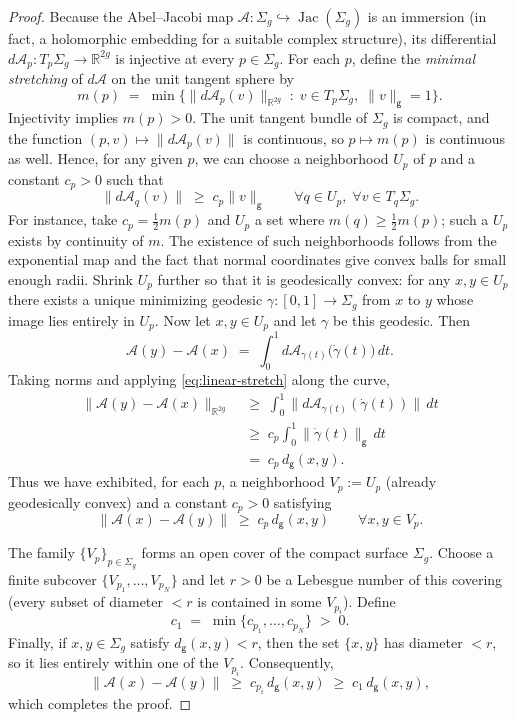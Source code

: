 \documentclass[11pt]{article}
\theoremstyle{definition}
\begin{document}
	\begin{proof}
		Because the Abel--Jacobi map $\mathcal A:\Sigma_g \hookrightarrow
		\operatorname{Jac}(\Sigma_g)$ is an immersion (in fact, a holomorphic embedding
		for a suitable complex structure), its differential $d\mathcal A_p : T_p\Sigma_g
		\longrightarrow \mathbb R^{2g}$ is injective at every $p\in\Sigma_g$. For each
		$p$, define the \emph{minimal stretching} of $d\mathcal A$ on the unit tangent
		sphere by
		\[
		m(p) \;=\; \min\bigl\{ \|d\mathcal A_p(v)\|_{\mathbb R^{2g}} \;:\; v\in
		T_p\Sigma_g,\; \|v\|_{\mathsf g}=1 \bigr\}.
		\]
		Injectivity implies $m(p)>0$. The unit tangent bundle of $\Sigma_g$ is compact,
		and the function $(p,v)\mapsto \|d\mathcal A_p(v)\|$ is continuous, so $p\mapsto
		m(p)$ is continuous as well. Hence, for any given $p$, we can choose a
		neighborhood $U_p$ of $p$ and a constant $c_p>0$ such that
		\begin{equation}\label{eq:linear-stretch}
			\|d\mathcal A_q(v)\| \;\ge\; c_p \|v\|_{\mathsf g}
			\qquad \forall q\in U_p,\; \forall v\in T_q\Sigma_g.
		\end{equation}
		For instance, take $c_p = \frac12 m(p)$ and $U_p$ a set where $m(q) \ge \frac12
		m(p)$; such a $U_p$ exists by continuity of $m$.	The existence of such neighborhoods follows from the exponential map and the
		fact that normal coordinates give convex balls for small enough radii. Shrink
		$U_p$ further so that it is geodesically convex: for any $x,y\in U_p$ there
		exists a unique minimizing geodesic $\gamma:[0,1]\to\Sigma_g$ from $x$ to $y$
		whose image lies entirely in $U_p$. Now let $x,y\in U_p$ and let $\gamma$ be
		this geodesic. Then
		\[
		\mathcal A(y)-\mathcal A(x) \;=\; \int_0^1 d\mathcal A_{\gamma(t)}\bigl(\dot\gamma(t)\bigr)\,dt.
		\]
		Taking norms and applying \eqref{eq:linear-stretch} along the curve,
		\[
		\begin{aligned}
			\|\mathcal A(y)-\mathcal A(x)\|_{\mathbb R^{2g}}
			&\;\ge\; \int_0^1 \bigl\| d\mathcal A_{\gamma(t)}(\dot\gamma(t)) \bigr\|\,dt \\
			&\;\ge\; c_p \int_0^1 \|\dot\gamma(t)\|_{\mathsf g}\,dt \\
			&\;=\; c_p\, d_{\mathsf g}(x,y).
		\end{aligned}
		\]
		Thus we have exhibited, for each $p$, a neighborhood $V_p:=U_p$ (already
		geodesically convex) and a constant $c_p>0$ satisfying
		\[
		\|\mathcal A(x)-\mathcal A(y)\| \;\ge\; c_p\, d_{\mathsf g}(x,y) \qquad
		\forall x,y\in V_p.
		\]
		
		The family $\{V_p\}_{p\in\Sigma_g}$ forms an open cover of the compact surface
		$\Sigma_g$. Choose a finite subcover $\{V_{p_1},\dots,V_{p_N}\}$ and let $r>0$
		be a Lebesgue number of this covering (every subset of diameter $<r$ is
		contained in some $V_{p_i}$). Define
		\[
		c_1 \;=\; \min\{ c_{p_1}, \dots, c_{p_N} \} \;>\;0.
		\]
		Finally, if $x,y\in\Sigma_g$ satisfy $d_{\mathsf g}(x,y)<r$, then the set
		$\{x,y\}$ has diameter $<r$, so it lies entirely within one of the $V_{p_i}$.
		Consequently,
		\[
		\|\mathcal A(x)-\mathcal A(y)\| \;\ge\; c_{p_i}\, d_{\mathsf g}(x,y) \;\ge\;
		c_1\, d_{\mathsf g}(x,y),
		\]
		which completes the proof.
	\end{proof}
	
\end{document}
